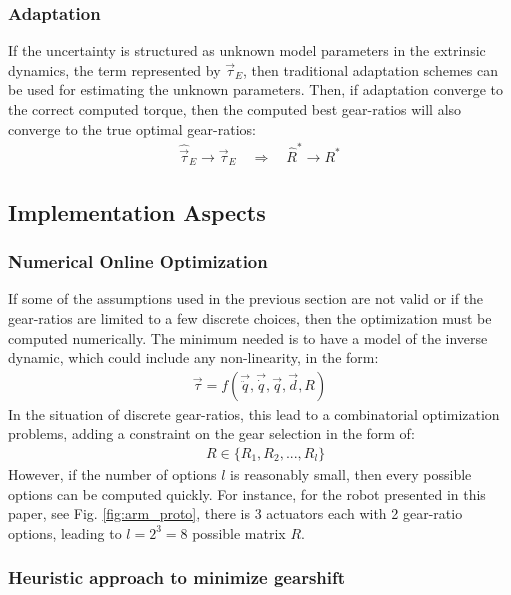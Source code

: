 \subsubsection{Adaptation}
If the uncertainty is structured as unknown model parameters in the extrinsic dynamics, the term represented by $\vec{\tau}_E$, then traditional adaptation schemes can be used for estimating the unknown parameters. Then, if adaptation converge to the correct computed torque, then the computed best gear-ratios will also converge to the true optimal gear-ratios:
\begin{align}
	\hat{\vec{\tau}}_E \rightarrow \vec{\tau}_E 
    \quad \Rightarrow \quad 
    \hat{R}^* \rightarrow R^*
 \label{eq:adapt}
\end{align}


\subsection{Implementation Aspects}

\subsubsection{Numerical Online Optimization}

If some of the assumptions used in the previous section are not valid or if the gear-ratios are limited to a few discrete choices, then the optimization must be computed numerically. The minimum needed is to have a model of the inverse dynamic, which could include any non-linearity, in the form:
\begin{align}
	\vec{\tau}  = f( \vec{\ddot{q}} , \vec{\dot{q}} , \vec{q} , \vec{d} , R ) 
\end{align}
In the situation of discrete gear-ratios, this lead to a combinatorial optimization problems, adding a constraint on the gear selection in the form of:
\begin{align}
	&  R \in \{R_1,R_2, ... , R_l\} 
\end{align}
However, if the number of options $l$ is reasonably small, then every possible options can be computed quickly. For instance, for the robot presented in this paper, see Fig. \ref{fig:arm_proto}, there is 3 actuators each with 2 gear-ratio options, leading to $l=2^3=8$ possible matrix $R$.


\subsubsection{Heuristic approach to minimize gearshift}

